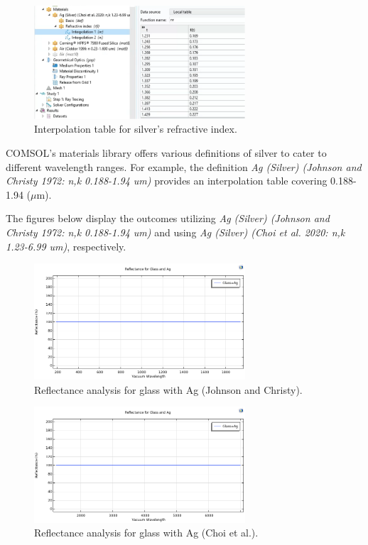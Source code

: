 \begin{figure}[H]
  \centering
  \includegraphics[width=0.7\textwidth]{Chapters/Figures/Chapter 4 Figures/Interpolation Table for Silver.png}
  \caption{Interpolation table for silver's refractive index.}
  \label{fig:Interpolation table for silver's refractive index}
\end{figure}

COMSOL's materials library offers various definitions of silver to cater to different wavelength ranges. For example, the definition \emph{Ag (Silver) (Johnson and Christy 1972: n,k 0.188-1.94 um)} provides an interpolation table covering 0.188-1.94 ($\mu$m).

The figures below display the outcomes utilizing \emph{Ag (Silver) (Johnson and Christy 1972: n,k 0.188-1.94 um)} and using \emph{Ag (Silver) (Choi et al. 2020: n,k 1.23-6.99 um)}, respectively.

\begin{figure}[H]
  \centering
  \includegraphics[width=0.7\textwidth]{Chapters/Figures/Chapter 4 Figures/Reflectance for glass and Ag (Johnson and Christy).png}
  \caption{Reflectance analysis for glass with Ag (Johnson and Christy).}
  \label{fig:Reflectance analysis for glass with Ag (Johnson and Christy)}
\end{figure}

\begin{figure}[H]
  \centering
  \includegraphics[width=0.7\textwidth]{Chapters/Figures/Chapter 4 Figures/Reflectance for glass and Ag for Choi et al.png}
  \caption{Reflectance analysis for glass with Ag (Choi et al.).}
  \label{fig:Reflectance analysis for glass with Ag (Choi et al)}
\end{figure}

